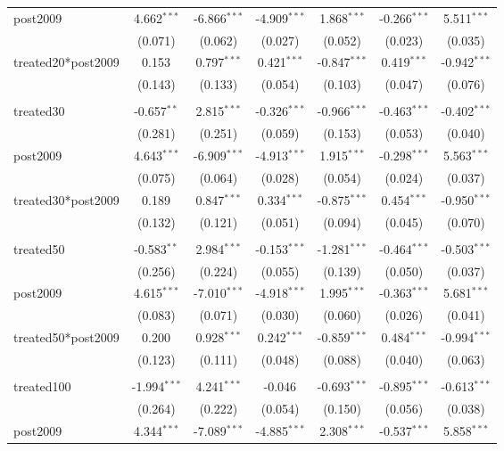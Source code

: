\documentclass[12pt]{article}
\begin{document}
\begin{table}[!htbp]
\begin{tabular}{@{\extracolsep{5pt}}lcccccc}
 post2009 & 4.662$^{***}$ & -6.866$^{***}$ & -4.909$^{***}$ & 1.868$^{***}$ & -0.266$^{***}$ & 5.511$^{***}$ \\
  & (0.071) & (0.062) & (0.027) & (0.052) & (0.023) & (0.035) \\
 treated20*post2009 & 0.153$^{}$ & 0.797$^{***}$ & 0.421$^{***}$ & -0.847$^{***}$ & 0.419$^{***}$ & -0.942$^{***}$ \\
  & (0.143) & (0.133) & (0.054) & (0.103) & (0.047) & (0.076) \\
\hline \\[-1.8ex]
 treated30 & -0.657$^{**}$ & 2.815$^{***}$ & -0.326$^{***}$ & -0.966$^{***}$ & -0.463$^{***}$ & -0.402$^{***}$ \\
  & (0.281) & (0.251) & (0.059) & (0.153) & (0.053) & (0.040) \\
 post2009 & 4.643$^{***}$ & -6.909$^{***}$ & -4.913$^{***}$ & 1.915$^{***}$ & -0.298$^{***}$ & 5.563$^{***}$ \\
  & (0.075) & (0.064) & (0.028) & (0.054) & (0.024) & (0.037) \\
 treated30*post2009 & 0.189$^{}$ & 0.847$^{***}$ & 0.334$^{***}$ & -0.875$^{***}$ & 0.454$^{***}$ & -0.950$^{***}$ \\
  & (0.132) & (0.121) & (0.051) & (0.094) & (0.045) & (0.070) \\
\hline \\[-1.8ex]
 treated50 & -0.583$^{**}$ & 2.984$^{***}$ & -0.153$^{***}$ & -1.281$^{***}$ & -0.464$^{***}$ & -0.503$^{***}$ \\
  & (0.256) & (0.224) & (0.055) & (0.139) & (0.050) & (0.037) \\
 post2009 & 4.615$^{***}$ & -7.010$^{***}$ & -4.918$^{***}$ & 1.995$^{***}$ & -0.363$^{***}$ & 5.681$^{***}$ \\
  & (0.083) & (0.071) & (0.030) & (0.060) & (0.026) & (0.041) \\
 treated50*post2009 & 0.200$^{}$ & 0.928$^{***}$ & 0.242$^{***}$ & -0.859$^{***}$ & 0.484$^{***}$ & -0.994$^{***}$ \\
  & (0.123) & (0.111) & (0.048) & (0.088) & (0.040) & (0.063) \\
\hline \\[-1.8ex]
 treated100 & -1.994$^{***}$ & 4.241$^{***}$ & -0.046$^{}$ & -0.693$^{***}$ & -0.895$^{***}$ & -0.613$^{***}$ \\
  & (0.264) & (0.222) & (0.054) & (0.150) & (0.056) & (0.038) \\
 post2009 & 4.344$^{***}$ & -7.089$^{***}$ & -4.885$^{***}$ & 2.308$^{***}$ & -0.537$^{***}$ & 5.858$^{***}$ \\

\end{tabular}
\end{table}
\end{document}
